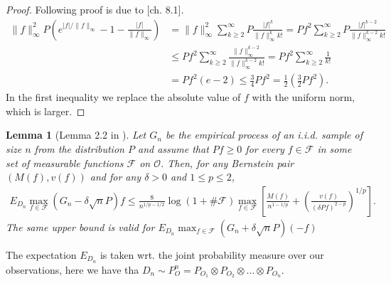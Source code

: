 \documentclass[11pt, a4paper]{article}
\newcommand\norm[1]{\lVert#1\rVert}
\newtheorem{lemma}[theorem]{Lemma}
\theoremstyle{definition}
\theoremstyle{remark}
\begin{document}
\begin{proof}
    Following proof is due to \parencite{vaart06}[ch. 8.1]. 
    \begin{align*}
        \norm{f}_{\infty}^2 P\left( e^{|f|/\norm{f}_{\infty}} -1 - \frac{|f|}{\norm{f}_{\infty}}\right) &= \norm{f}_{\infty}^{2} \sum_{k \geq 2}^{\infty} P \frac{|f|^{k}}{\norm{f}^{k}_{\infty}k!} = Pf^2 \sum_{k \geq 2}^{\infty} P\frac{|f|^{k-2}}{\norm{f}^{k-2}_{\infty} k! } \\
                                                                                                        &\leq P f^2 \sum_{k \geq 2}^{\infty} \frac{\norm{f}_{\infty}^{k-2}}{\norm{f}^{k-2}_{\infty} k! } = P f^2 \sum_{k \geq 2}^{\infty} \frac{1}{k !}\\
                                                                                                        &= P f^2 (e-2)\leq \frac{3}{4} P f^2 = \frac{1}{2} \left(\frac{3}{2} Pf^2\right). 
    \end{align*}
   In the first inequality we replace the absolute value of $ f $ with the uniform norm, which is larger. 
\end{proof}


\begin{lemma}[Lemma 2.2 in \parencite{vaart06}] \label{finitesamplebound}
    Let $G_{n}$ be the empirical process of an i.i.d. sample of size $n$ from the distribution $P$ and assume that $P f \geq 0$ for every $f \in \mathcal{F}$ in some set of measurable functions $ \mathcal{F} $ on $ \mathcal{O} $. Then, for any Bernstein pair $(M(f), v(f))$ and for any $\delta>0$ and $1 \leq p \leq 2$,
    \begin{align*}
        E_{D_n} \max_{f \in \mathcal{F}}(G_n-\delta \sqrt{n} P) f \leq \frac{8}{n^{1 / p-1 / 2}} \log (1+\# \mathcal{F}) \max _{f \in \mathcal{F}}\left[\frac{M(f)}{n^{1-1 / p}}+\left(\frac{v(f)}{(\delta P f)^{2-p}}\right)^{1 / p}\right].
    \end{align*}
    The same upper bound is valid for $ E_{D_n} \max_{f \in \mathcal{F}}(G_n+\delta \sqrt{n} P)(-f) $  
\end{lemma}
The expectation $ E_{D_n} $ is taken wrt. the joint probability measure over our observations, here we have tha $ D_n \sim P_{O}^{n} = P_{O_1} \otimes P_{O_2} \otimes \dots \otimes P_{O_n} $. 
\end{document}
